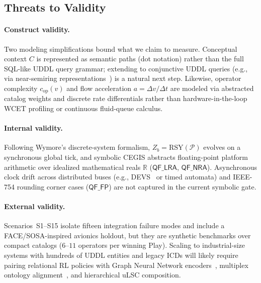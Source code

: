 \subsection{Threats to Validity} \label{sec:disc-limitations}

\paragraph{Construct validity.}
Two modeling simplifications bound what we claim to measure.  Conceptual context $C$ is represented as semantic paths (dot notation) rather than the full SQL-like UDDL query grammar; extending to conjunctive UDDL queries (e.g., via near-semiring representations~\cite{mckibben2026nearring}) is a natural next step.  Likewise, operator complexity $c_{\text{op}}(v)$ and flow acceleration $a = \Delta v / \Delta t$ are modeled via abstracted catalog weights and discrete rate differentials rather than hardware-in-the-loop WCET profiling or continuous fluid-queue calculus.

\paragraph{Internal validity.}
Following Wymore's discrete-system formalism, $Z_b = \mathrm{RSY}(\mathcal{P})$ evolves on a synchronous global tick, and symbolic CEGIS abstracts floating-point platform arithmetic over idealized mathematical reals $\mathbb{R}$ ($\mathsf{QF\_LRA}$, $\mathsf{QF\_NRA}$).  Asynchronous clock drift across distributed buses (e.g., DEVS~\cite{ZeiglerPraehoferKim2000, wach2021devs} or timed automata) and IEEE-754 rounding corner cases ($\mathsf{QF\_FP}$) are not captured in the current symbolic gate.

\paragraph{External validity.}
Scenarios~S1--S15 isolate fifteen integration failure modes and include a FACE/SOSA-inspired avionics holdout, but they are synthetic benchmarks over compact catalogs ($6$--$11$ operators per winning Play).  Scaling to industrial-size systems with hundreds of UDDL entities and legacy ICDs will likely require pairing relational RL policies with Graph Neural Network encoders~\cite{Battaglia2018GN}, multiplex ontology alignment~\cite{mckibben2026multiplex, mckibben2026alignment}, and hierarchical uLSC composition.
